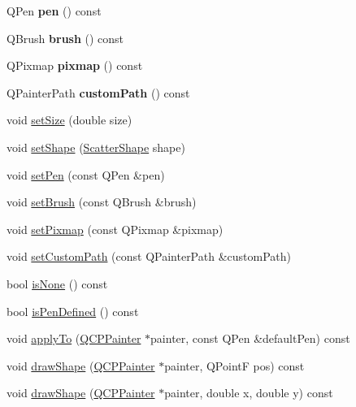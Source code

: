 \begin{DoxyCompactItemize}
\mbox{\label{class_q_c_p_scatter_style_acdd6313d16e69d3810e9d1f48dd9e4bb}} 
Q\+Pen {\bfseries pen} () const
\item 
\mbox{\label{class_q_c_p_scatter_style_adc4f66aed84f1d7a3a5aabf4f48f31a6}} 
Q\+Brush {\bfseries brush} () const
\item 
\mbox{\label{class_q_c_p_scatter_style_a9b2d1a2ec0aac0c74f7582d14050e93a}} 
Q\+Pixmap {\bfseries pixmap} () const
\item 
\mbox{\label{class_q_c_p_scatter_style_aef1fac84c9830fd97f2a8568e605e372}} 
Q\+Painter\+Path {\bfseries custom\+Path} () const
\item 
void \mbox{\hyperlink{class_q_c_p_scatter_style_aaefdd031052892c4136129db68596e0f}{set\+Size}} (double size)
\item 
void \mbox{\hyperlink{class_q_c_p_scatter_style_a7c641c4d4c6d29cb705d3887cfce91c1}{set\+Shape}} (\mbox{\hyperlink{class_q_c_p_scatter_style_adb31525af6b680e6f1b7472e43859349}{Scatter\+Shape}} shape)
\item 
void \mbox{\hyperlink{class_q_c_p_scatter_style_a761f1f229cc0ca4703e1e2b89f6dd1ba}{set\+Pen}} (const Q\+Pen \&pen)
\item 
void \mbox{\hyperlink{class_q_c_p_scatter_style_a74d692aaeb8d4b36d6f7d510e44264b1}{set\+Brush}} (const Q\+Brush \&brush)
\item 
void \mbox{\hyperlink{class_q_c_p_scatter_style_a5fb611d46acfac520d7b89a1c71d9246}{set\+Pixmap}} (const Q\+Pixmap \&pixmap)
\item 
void \mbox{\hyperlink{class_q_c_p_scatter_style_a96a3e949f90b2afe5677ca9412a12a1e}{set\+Custom\+Path}} (const Q\+Painter\+Path \&custom\+Path)
\item 
bool \mbox{\hyperlink{class_q_c_p_scatter_style_a72db6bcb1e1abd6e53c1315dd3dea7e4}{is\+None}} () const
\item 
bool \mbox{\hyperlink{class_q_c_p_scatter_style_a47077eb6450fe9a788f833e4ec1b1d5a}{is\+Pen\+Defined}} () const
\item 
void \mbox{\hyperlink{class_q_c_p_scatter_style_afd8044ece445300499ca0dc164821e0f}{apply\+To}} (\mbox{\hyperlink{class_q_c_p_painter}{Q\+C\+P\+Painter}} $\ast$painter, const Q\+Pen \&default\+Pen) const
\item 
void \mbox{\hyperlink{class_q_c_p_scatter_style_a2b3964961b6cbfbc87be6e1e3a6f3c96}{draw\+Shape}} (\mbox{\hyperlink{class_q_c_p_painter}{Q\+C\+P\+Painter}} $\ast$painter, Q\+PointF pos) const
\item 
void \mbox{\hyperlink{class_q_c_p_scatter_style_a95c297b114c77c22428ef40f54620ddf}{draw\+Shape}} (\mbox{\hyperlink{class_q_c_p_painter}{Q\+C\+P\+Painter}} $\ast$painter, double x, double y) const
\end{DoxyCompactItemize}
